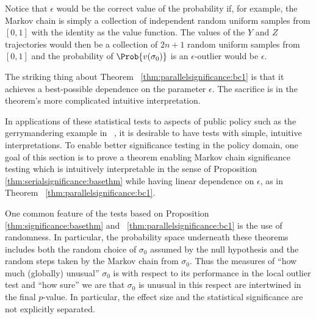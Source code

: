 \documentclass[12pt]{article}
\begin{document}

\begin{remark}
    Notice that \( \epsilon \) would be the correct value of the
    probability if, for example, the Markov chain is simply a collection
    of independent random uniform samples from \( [0,1] \) with the
    identity as the value function.  The values of the \( Y \) and \( Z \)
    trajectories would then be a collection of \( 2n + 1 \) random
    uniform samples from \( [0,1] \) and the probability of \( \Prob{v(\sigma_0)}
    \) is an \( \epsilon \)-outlier would be \( \epsilon \).

    The striking thing about Theorem~%
    \ref{thm:parallelsignificance:bc1} is that it achieves a
    best-possible dependence on the parameter \( \epsilon \).  The
    sacrifice is in the theorem's more complicated intuitive
    interpretation.

    In applications of these statistical tests to aspects of public
    policy such as the gerrymandering example in~%
    \cite{doi:10.1080/2330443X.2020.1806763}, it is desirable to have
    tests with simple, intuitive interpretations.  To enable better
    significance testing in the policy domain, one goal of this section
    is to prove a theorem enabling Markov chain significance testing
    which is intuitively interpretable in the sense of Proposition~%
    \ref{thm:serialsignificance:basethm} while having linear dependence
    on \( \epsilon \), as in Theorem~%
    \ref{thm:parallelsignificance:bc1}.
\end{remark}

\begin{remark}
    One common feature of the tests based on Proposition~%
    \ref{thm:significance:basethm} and~%
    \ref{thm:parallelsignificance:bc1} is the use of randomness.  In
    particular, the probability space underneath these theorems includes
    both the random choice of \( \sigma_0 \) assumed by the null
    hypothesis and the random steps taken by the Markov chain from \(
    \sigma_0 \).  Thus the measures of ``how much (globally) unusual'' \(
    \sigma_0 \) is with respect to its performance in the local outlier
    test and ``how sure'' we are that \( \sigma_0 \) is unusual in this
    respect are intertwined in the final \( p \)-value.  In particular,
    the effect size and the statistical significance are not explicitly
    separated.
\end{remark}
\end{document}

